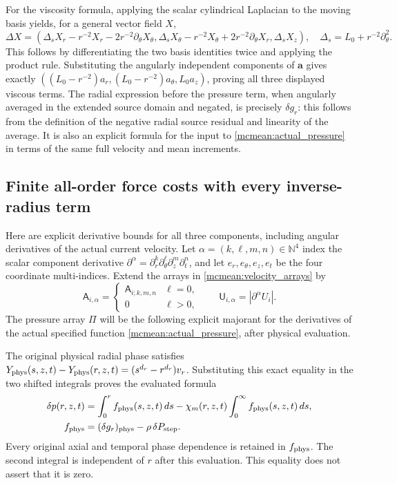 \documentclass[11pt]{article}
\begin{document}
For the viscosity formula, applying the scalar cylindrical Laplacian
to the moving basis yields, for a general vector field \(X\),
\[
 \Delta X=
 \left(\Delta_sX_r-r^{-2}X_r-2r^{-2}\partial_\theta X_\theta,
       \Delta_sX_\theta-r^{-2}X_\theta+2r^{-2}\partial_\theta X_r,
       \Delta_sX_z\right),
 \quad\Delta_s=L_0+r^{-2}\partial_\theta^2.
\]
This follows by differentiating the two basis identities twice and
applying the product rule. Substituting the angularly independent
components of \(\boldsymbol a\) gives exactly
\(((L_0-r^{-2})a_r,(L_0-r^{-2})a_\theta,L_0a_z)\), proving all
three displayed viscous terms.
The radial expression before the pressure term, when angularly
averaged in the extended source domain and negated, is precisely
\(\delta g_r\): this follows from the definition of the negative
radial source residual and linearity of the average. It is also an
explicit formula for the input to \eqref{mcmean:actual_pressure} in
terms of the same full velocity and mean increments.

\subsection{Finite all-order force costs with every inverse-radius term}

Here are explicit derivative bounds for all three components, including
angular derivatives of the actual current velocity. Let
\(\alpha=(k,\ell,m,n)\in\mathbb N^4\) index the scalar component
derivative \(\partial^\alpha=\partial_r^k\partial_\theta^\ell
\partial_z^m\partial_t^n\), and let
\(e_r,e_\theta,e_z,e_t\) be the four coordinate multi-indices.
Extend the arrays in \eqref{mcmean:velocity_arrays} by
\[
 \mathsf A_{i,\alpha}=
 \begin{cases}\mathsf A_{i;k,m,n}&\ell=0,\\0&\ell>0,
 \end{cases}
 \qquad
 \mathsf U_{i,\alpha}=|\partial^\alpha U_i|.
\]
The pressure array \(\mathsf\Pi\) will be the following explicit
majorant for the derivatives of the actual specified function
\eqref{mcmean:actual_pressure}, after physical evaluation.

The original physical radial phase satisfies
\(Y_{\rm phys}(s,z,t)-Y_{\rm phys}(r,z,t)
=(s^{d_r}-r^{d_r})v_r\). Substituting this exact equality in the
two shifted integrals proves the evaluated formula
\begin{equation}\label{mcmean:evaluated_pressure}
\begin{split}
 \delta p(r,z,t)
 &=\int_0^r f_{\rm phys}(s,z,t)\,ds
        -\chi_m(r,z,t)\int_0^\infty f_{\rm phys}(s,z,t)\,ds,\\
 f_{\rm phys}&=(\delta g_r)_{\rm phys}
                       -\rho\,\delta P_{\rm step}.
\end{split}
\end{equation}
Every original axial and temporal phase dependence is retained in
\(f_{\rm phys}\). The second integral is independent of \(r\)
after this evaluation. This equality does not assert that it is zero.
\end{document}
